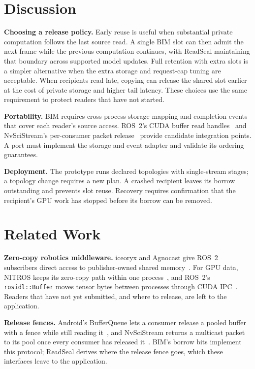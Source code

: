 \documentclass[conference]{IEEEtran}
\newcommand{\code}[1]{\texttt{#1}}
\begin{document}
\section{Discussion}
\label{sec:discussion}

\textbf{Choosing a release policy.} Early reuse is useful when substantial private computation follows the last source read. A single BIM slot can then admit the next frame while the previous computation continues, with ReadSeal maintaining that boundary across supported model updates. Full retention with extra slots is a simpler alternative when the extra storage and request-cap tuning are acceptable. When recipients read late, copying can release the shared slot earlier at the cost of private storage and higher tail latency. These choices use the same requirement to protect readers that have not started.

\textbf{Portability.} BIM requires cross-process storage mapping and completion events that cover each reader's source access. ROS~2's CUDA buffer read handles~\cite{cudabackend} and NvSciStream's per-consumer packet release~\cite{nvscistream} provide candidate integration points. A port must implement the storage and event adapter and validate its ordering guarantees.

\textbf{Deployment.} The prototype runs declared topologies with single-stream stages; a topology change requires a new plan. A crashed recipient leaves its borrow outstanding and prevents slot reuse. Recovery requires confirmation that the recipient's GPU work has stopped before its borrow can be removed.

\section{Related Work}
\label{sec:related}

\textbf{Zero-copy robotics middleware.} iceoryx and Agnocast give ROS~2 subscribers direct access to publisher-owned shared memory~\cite{iceoryx,agnocast}. For GPU data, NITROS keeps its zero-copy path within one process~\cite{nitros}, and ROS~2's \code{rosidl::Buffer} moves tensor bytes between processes through CUDA IPC~\cite{rosidlbuffer}. Readers that have not yet submitted, and where to release, are left to the application.

\textbf{Release fences.} Android's BufferQueue lets a consumer release a pooled buffer with a fence while still reading it~\cite{bufferqueue}, and NvSciStream returns a multicast packet to its pool once every consumer has released it~\cite{nvscistream}. BIM's borrow bits implement this protocol; ReadSeal derives where the release fence goes, which these interfaces leave to the application.
\end{document}

